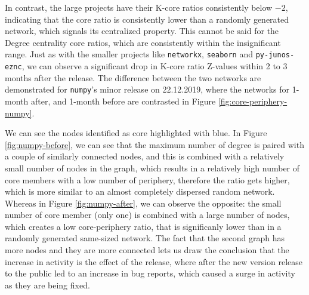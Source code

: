 In contrast, the large projects have their K-core ratios consistently below $-2$, indicating that the core ratio is consistently lower than a randomly generated network, which signals its centralized property. This cannot be said for the Degree centrality core ratios, which are consistently within the insignificant range. Just as with the smaller projects like \texttt{networkx}, \texttt{seaborn} and \texttt{py-junos-eznc}, we can observe a significant drop in K-core ratio Z-values within 2 to 3 months after the release. The difference between the two networks are demonstrated for \texttt{numpy}'s minor release on 22.12.2019, where the networks for 1-month after, and 1-month before are contrasted in Figure \ref{fig:core-periphery-numpy}.

We can see the nodes identified as core highlighted with blue. In Figure \ref{fig:numpy-before}, we can see that the maximum number of degree is paired with a couple of similarly connected nodes, and this is combined with a relatively small number of nodes in the graph, which results in a relatively high number of core members with a low number of periphery, therefore the ratio gets higher, which is more similar to an almost completely dispersed random network. Whereas in Figure \ref{fig:numpy-after}, we can observe the opposite: the small number of core member (only one) is combined with a large number of nodes, which creates a low core-periphery ratio, that is significanly lower than in a randomly generated same-sized network. The fact that the second graph has more nodes and they are more connected lets us draw the conclusion that the increase in activity is the effect of the release, where after the new version release to the public led to an increase in bug reports, which caused a surge in activity as they are being fixed.


